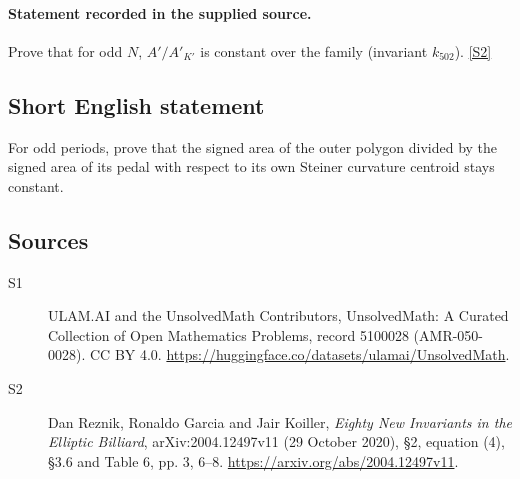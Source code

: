 \documentclass[11pt]{article}
\newcommand{\sref}[2]{\hyperlink{source:#1:#2}{[S#2]}}
\begin{document}
\paragraph{Statement recorded in the supplied source.}
Prove that for odd $N$, $A'/A'_{K'}$ is constant over the family (invariant $k_{502}$). \sref{5100028}{2}
\subsection{Short English statement}
For odd periods, prove that the signed area of the outer polygon divided by the signed area of its pedal with respect to its own Steiner curvature centroid stays constant.
\subsection{Sources}
\begin{description}
\item[\hypertarget{source:5100028:1}{S1}] ULAM.AI and the UnsolvedMath Contributors, UnsolvedMath: A Curated Collection of Open Mathematics Problems, record 5100028 (AMR-050-0028). CC BY 4.0. \url{https://huggingface.co/datasets/ulamai/UnsolvedMath}.
\item[\hypertarget{source:5100028:2}{S2}] Dan Reznik, Ronaldo Garcia and Jair Koiller, \emph{Eighty New Invariants in the Elliptic Billiard}, arXiv:2004.12497v11 (29 October 2020), \S2, equation (4), \S3.6 and Table 6, pp. 3, 6--8. \url{https://arxiv.org/abs/2004.12497v11}.
\end{description}
\label{end:5100028}
\end{document}
